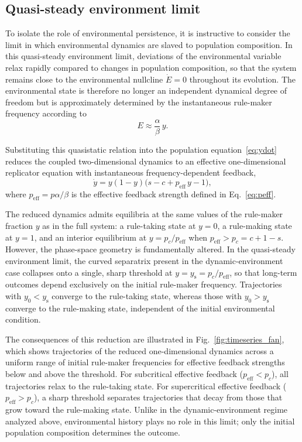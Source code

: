 \documentclass[11pt]{article}
\begin{document}
\subsection{Quasi-steady environment limit}

To isolate the role of environmental persistence, it is instructive to consider the limit in which
environmental dynamics are slaved to population composition. In this quasi-steady environment
limit, deviations of the environmental variable relax rapidly compared to changes in population
composition, so that the system remains close to the environmental nullcline $\dot E = 0$ throughout
its evolution. The environmental state is therefore no longer an independent dynamical degree of
freedom but is approximately determined by the instantaneous rule-maker frequency according to
\[
E \approx \frac{\alpha}{\beta}\,y.
\]

Substituting this quasistatic relation into the population equation~\eqref{eq:ydot}
reduces the coupled two-dimensional dynamics to an effective one-dimensional replicator
equation with instantaneous frequency-dependent feedback,
\[
\dot y = y(1-y)\bigl(s - c + p_{\mathrm{eff}}\,y - 1\bigr),
\]
where $p_{\mathrm{eff}} = p\alpha/\beta$ is the effective feedback strength defined in
Eq.~\eqref{eq:peff}.

The reduced dynamics admits equilibria at the same values of the rule-maker fraction $y$
as in the full system: a rule-taking state at $y=0$, a rule-making state at $y=1$, and an
interior equilibrium at $y = p_c/p_{\mathrm{eff}}$ when $p_{\mathrm{eff}} > p_c = c + 1 - s$.
However, the phase-space geometry is fundamentally altered. In the quasi-steady environment limit,
the curved separatrix present in the dynamic-environment case collapses onto a single,
sharp threshold at $y = y_{\mathrm{s}} = p_c/p_{\mathrm{eff}}$, so that long-term outcomes
depend exclusively on the initial rule-maker frequency. Trajectories with $y_0 <
y_{\mathrm{s}}$ converge to the rule-taking state, whereas those with $y_0 >
y_{\mathrm{s}}$ converge to the rule-making state, independent of the initial
environmental condition.

The consequences of this reduction are illustrated in
Fig.~\ref{fig:timeseries_fan}, which shows trajectories of the reduced one-dimensional
dynamics across a uniform range of initial rule-maker frequencies for effective feedback strengths
below and above the threshold. For subcritical effective feedback ($p_{\mathrm{eff}} < p_c$), all trajectories
relax to the rule-taking state. For supercritical effective feedback ($p_{\mathrm{eff}} > p_c$), a sharp threshold
separates trajectories that decay from those that grow toward the rule-making state.
Unlike in the dynamic-environment regime analyzed above, environmental history plays no
role in this limit; only the initial population composition determines the outcome.
\end{document}
